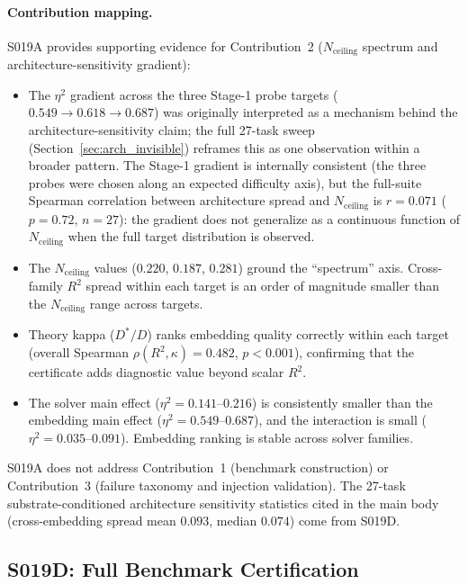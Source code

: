 \documentclass{article}
\begin{document}
\paragraph{Contribution mapping.}
S019A provides supporting evidence for Contribution~2 ($N_{\text{ceiling}}$ spectrum and architecture-sensitivity gradient):
\begin{itemize}
\item The $\eta^2$ gradient across the three Stage-1 probe targets ($0.549 \to 0.618 \to 0.687$) was originally interpreted as a mechanism behind the architecture-sensitivity claim; the full 27-task sweep (Section~\ref{sec:arch_invisible}) reframes this as one observation within a broader pattern. The Stage-1 gradient is internally consistent (the three probes were chosen along an expected difficulty axis), but the full-suite Spearman correlation between architecture spread and $N_{\text{ceiling}}$ is $r = 0.071$ ($p = 0.72$, $n = 27$): the gradient does not generalize as a continuous function of $N_{\text{ceiling}}$ when the full target distribution is observed.
\item The $N_{\text{ceiling}}$ values ($0.220$, $0.187$, $0.281$) ground the ``spectrum'' axis. Cross-family $R^2$ spread within each target is an order of magnitude smaller than the $N_{\text{ceiling}}$ range across targets.
\item Theory kappa ($D^*/D$) ranks embedding quality correctly within each target (overall Spearman $\rho(R^2, \kappa) = 0.482$, $p < 0.001$), confirming that the certificate adds diagnostic value beyond scalar $R^2$.
\item The solver main effect ($\eta^2 = 0.141$--$0.216$) is consistently smaller than the embedding main effect ($\eta^2 = 0.549$--$0.687$), and the interaction is small ($\eta^2 = 0.035$--$0.091$). Embedding ranking is stable across solver families.
\end{itemize}
S019A does not address Contribution~1 (benchmark construction) or Contribution~3 (failure taxonomy and injection validation). The 27-task substrate-conditioned architecture sensitivity statistics cited in the main body (cross-embedding spread mean $0.093$, median $0.074$) come from S019D.

\subsection{S019D: Full Benchmark Certification}
\label{app:s019d}
\end{document}
